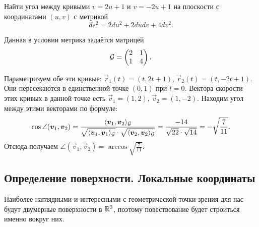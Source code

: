 \begin{problem}
	Найти угол между кривыми $v = 2u + 1$ и $v = -2u + 1$ на плоскости с координатами $(u, v)$ с метрикой
	\[
		ds^2 = 2du^2 + 2dudv + 4dv^2.
	\]
\end{problem}

\begin{solution}
	Данная в условии метрика задаётся матрицей
	\[
		\mathcal{G} =
		\begin{pmatrix}
			2 & 1\\
			1 & 4
		\end{pmatrix}.
	\]

	Параметризуем обе эти кривые: $\vec{r}_1(t) = (t, 2t + 1)$, $\vec{r}_2(t) = (t, -2t + 1)$. Они пересекаются в единственной точке $(0, 1)$ при $t = 0$. Вектора скорости этих кривых в данной точке есть $\vec{v}_1 = (1, 2)$, $\vec{v}_2 = (1, -2)$. Находим угол между этими векторами по формуле:
	\[
		\cos\angle(\boldsymbol{v}_1, \boldsymbol{v}_2) = \frac{\langle\boldsymbol{v}_1, \boldsymbol{v}_2\rangle_{\mathcal{G}}}{\sqrt{\langle\boldsymbol{v}_1, \boldsymbol{v}_1\rangle_{\mathcal{G}}} \cdot \sqrt{\langle\boldsymbol{v}_2, \boldsymbol{v}_2\rangle_{\mathcal{G}}}} = \frac{-14}{\sqrt{22} \cdot \sqrt{14}} = -\sqrt{\frac{7}{11}}.
	\]
	Отсюда получаем $\angle(\vec{v}_1, \vec{v}_2) = \arccos\sqrt{\frac{7}{11}}$.
\end{solution}

\subsection{Определение поверхности. Локальные координаты}

Наиболее наглядными и интересными с геометрической точки зрения для нас будут двумерные поверхности в $\mathbb{R}^3$, поэтому повествование будет строиться именно вокруг них.

